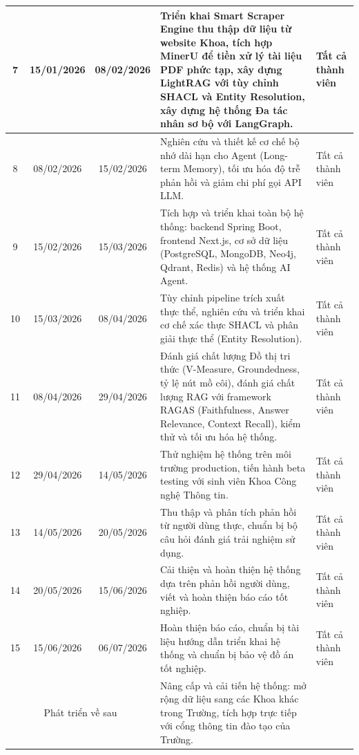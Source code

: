 \documentclass{article}[13pt]
\begin{document}
{\begin{longtable}{|c|c|c|p{7cm}|p{3cm}|}
        7 & 15/01/2026 & 08/02/2026 &
        Triển khai Smart Scraper Engine thu thập dữ liệu từ website Khoa, tích hợp MinerU để tiền xử lý tài liệu PDF phức tạp, xây dựng LightRAG với tùy chỉnh SHACL và Entity Resolution, xây dựng hệ thống Đa tác nhân sơ bộ với LangGraph.
        & Tất cả thành viên \\ \hline

        8 & 08/02/2026 & 15/02/2026 &
        Nghiên cứu và thiết kế cơ chế bộ nhớ dài hạn cho Agent (Long-term Memory), tối ưu hóa độ trễ phản hồi và giảm chi phí gọi API LLM.
        & Tất cả thành viên \\ \hline

        9 & 15/02/2026 & 15/03/2026 &
        Tích hợp và triển khai toàn bộ hệ thống: backend Spring Boot, frontend Next.js, cơ sở dữ liệu (PostgreSQL, MongoDB, Neo4j, Qdrant, Redis) và hệ thống AI Agent.
        & Tất cả thành viên \\ \hline

        10 & 15/03/2026 & 08/04/2026 &
        Tùy chỉnh pipeline trích xuất thực thể, nghiên cứu và triển khai cơ chế xác thực SHACL và phân giải thực thể (Entity Resolution).
        & Tất cả thành viên \\ \hline

        11 & 08/04/2026 & 29/04/2026 &
        Đánh giá chất lượng Đồ thị tri thức (V-Measure, Groundedness, tỷ lệ nút mồ côi), đánh giá chất lượng RAG với framework RAGAS (Faithfulness, Answer Relevance, Context Recall), kiểm thử và tối ưu hóa hệ thống.
        & Tất cả thành viên \\ \hline

        12 & 29/04/2026 & 14/05/2026 &
        Thử nghiệm hệ thống trên môi trường production, tiến hành beta testing với sinh viên Khoa Công nghệ Thông tin.
        & Tất cả thành viên \\ \hline

        13 & 14/05/2026 & 20/05/2026 &
        Thu thập và phân tích phản hồi từ người dùng thực, chuẩn bị bộ câu hỏi đánh giá trải nghiệm sử dụng.
        & Tất cả thành viên \\ \hline

        14 & 20/05/2026 & 15/06/2026 &
        Cải thiện và hoàn thiện hệ thống dựa trên phản hồi người dùng, viết và hoàn thiện báo cáo tốt nghiệp.
        & Tất cả thành viên \\ \hline

        15 & 15/06/2026 & 06/07/2026 &
        Hoàn thiện báo cáo, chuẩn bị tài liệu hướng dẫn triển khai hệ thống và chuẩn bị bảo vệ đồ án tốt nghiệp.
        & Tất cả thành viên \\ \hline

        \multicolumn{3}{|c|}{Phát triển về sau} &
        Nâng cấp và cải tiến hệ thống: mở rộng dữ liệu sang các Khoa khác trong Trường, tích hợp trực tiếp với cổng thông tin đào tạo của Trường. &
        \\ \hline
    \end{longtable}
    }
\end{document}
